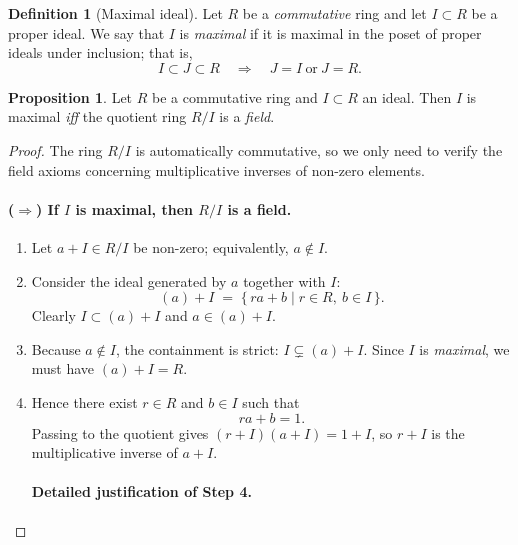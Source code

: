 \documentclass[12pt]{article}
\theoremstyle{definition} %
\newtheorem{proposition}{Proposition}
\newtheorem{definition}{Definition}
\theoremstyle{plain} %
\begin{document}
\begin{definition}[Maximal ideal]
  Let \(R\) be a \emph{commutative} ring and let \(I\subset R\) be a proper ideal.
  We say that \(I\) is \emph{maximal} if it is maximal in the poset of proper ideals
  under inclusion; that is,
  \[
     I\subset J\subset R\quad\Longrightarrow\quad J=I\ \text{or}\ J=R.
  \]
\end{definition}

\begin{proposition}
  Let \(R\) be a commutative ring and \(I\subset R\) an ideal.
  Then \(I\) is maximal \emph{iff} the quotient ring \(R/I\) is a \emph{field}.
\end{proposition}

\begin{proof}
  The ring \(R/I\) is automatically commutative, so we only need to verify the field
  axioms concerning multiplicative inverses of non-zero elements.

  \paragraph{(\(\Longrightarrow\)) If \(I\) is maximal, then \(R/I\) is a field.}
  \begin{enumerate}
    \item Let \(a+I\in R/I\) be non-zero; equivalently, \(a\notin I\).
    \item Consider the ideal generated by \(a\) together with \(I\):
          \[
             (a)+I \;=\; \{\,ra+b\mid r\in R,\ b\in I\,\}.
          \]
          Clearly \(I\subset (a)+I\) and \(a\in (a)+I\).
    \item Because \(a\notin I\), the containment is strict: \(I\subsetneq (a)+I\).
          Since \(I\) is \emph{maximal}, we must have \((a)+I = R\).
    \item Hence there exist \(r\in R\) and \(b\in I\) such that
          \[
             ra + b = 1 .
          \]
          Passing to the quotient gives \((r+I)(a+I)=1+I\), so \(r+I\) is the
          multiplicative inverse of \(a+I\).
\paragraph*{Detailed justification of Step 4.}


\end{enumerate}
\end{proof}
\end{document}
